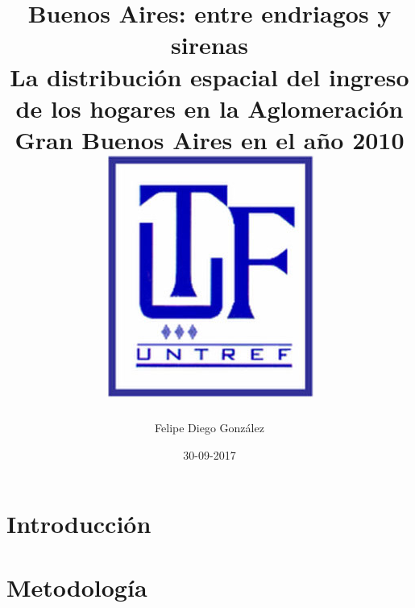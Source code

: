\documentclass{report}
\title{
	{Buenos Aires: entre endriagos y sirenas}\\
	{\large La distribución espacial del ingreso de los hogares en la Aglomeración Gran Buenos Aires en el año 2010}\\
	{\includegraphics{untrefLogo.jpg}}
}
\author{Felipe Diego González}
\date{30-09-2017}
\begin{document}
  	\maketitle
  	
  	\tableofcontents
  	
  	\chapter{Introducción}
  	

  	\chapter{Metodología}
  	
	  	
	
  		
  	 
  		
  	  	  
  	
  
\end{document}
